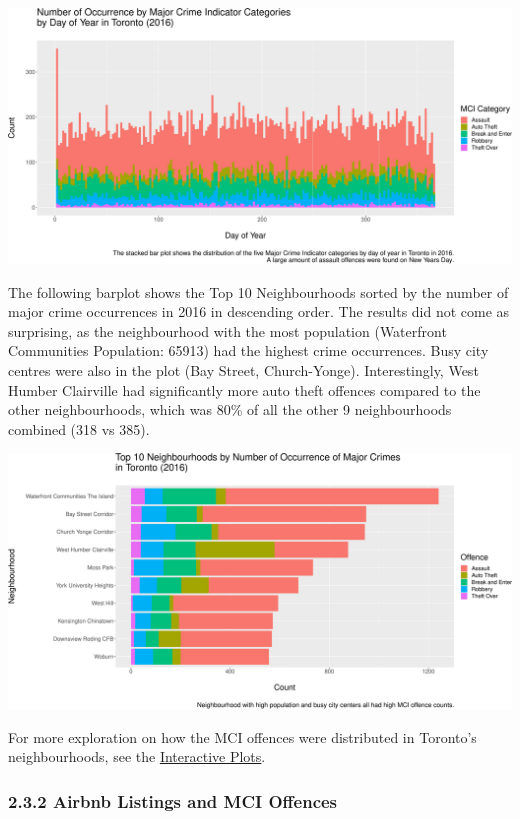 \documentclass[
]{article}
\begin{document}
\includegraphics{Final-Report_files/figure-latex/crime-by-time-1.pdf}

The following barplot shows the Top 10 Neighbourhoods sorted by the
number of major crime occurrences in 2016 in descending order. The
results did not come as surprising, as the neighbourhood with the most
population (Waterfront Communities Population: 65913) had the highest
crime occurrences. Busy city centres were also in the plot (Bay Street,
Church-Yonge). Interestingly, West Humber Clairville had significantly
more auto theft offences compared to the other neighbourhoods, which was
80\% of all the other 9 neighbourhoods combined (318 vs 385).

\includegraphics{Final-Report_files/figure-latex/crime-by-neighbourhood-1.pdf}

For more exploration on how the MCI offences were distributed in
Toronto's neighbourhoods, see the
\href{https://tyler-cy.github.io/JSC370-Final/Interactive-Visuals.html}{Interactive
Plots}.

\hypertarget{airbnb-listings-and-mci-offences}{%
\subsubsection{2.3.2 Airbnb Listings and MCI
Offences}\label{airbnb-listings-and-mci-offences}}
\end{document}
